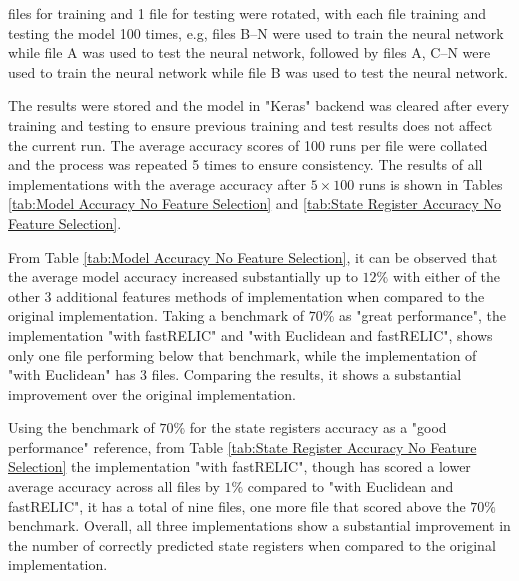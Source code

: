 \documentclass{tum-book}
\begin{document}
        \bigskip{} files for training and 1 file for testing were rotated, with each file training and testing the model 100 times, e.g, files B--N were used to train the neural network while file A was used to test the neural network, followed by files A, C--N were used to train the neural network while file B was used to test the neural network. 
        
        \bigskip\noindent
        The results were stored and the model in "Keras" backend was cleared after every training and testing to ensure previous training and test results does not affect the current run. The average accuracy scores of 100 runs per file were collated and the process was repeated 5 times to ensure consistency. The results of all implementations with the average accuracy after $5 \times 100$ runs is shown in Tables \ref{tab:Model Accuracy No Feature Selection}  and \ref{tab:State Register Accuracy No Feature Selection}.
        

        \bigskip\noindent
        From Table \ref{tab:Model Accuracy No Feature Selection}, it can be observed that the average model accuracy increased substantially up to $12\%$ with either of the other 3 additional features methods of implementation when compared to the original implementation. Taking a benchmark of $70\%$ as "great performance", the implementation "with fastRELIC" and "with Euclidean and fastRELIC", shows only one file performing below that benchmark, while the implementation of "with Euclidean" has 3 files. Comparing the results, it shows a substantial improvement over the original implementation.
        
        \bigskip\noindent
        Using the benchmark of $70\%$ for the state registers accuracy as a "good performance" reference, from Table \ref{tab:State Register Accuracy No Feature Selection} the implementation "with fastRELIC", though has scored a lower average accuracy across all files by $1\%$ compared to "with Euclidean and fastRELIC", it has a total of nine files, one more file that scored above the $70\%$ benchmark. Overall, all three implementations show a substantial improvement in the number of correctly predicted state registers when compared to the original implementation.
 
        \begin{table}
            \centering
            

            
        \end{table}
        
\end{document}
